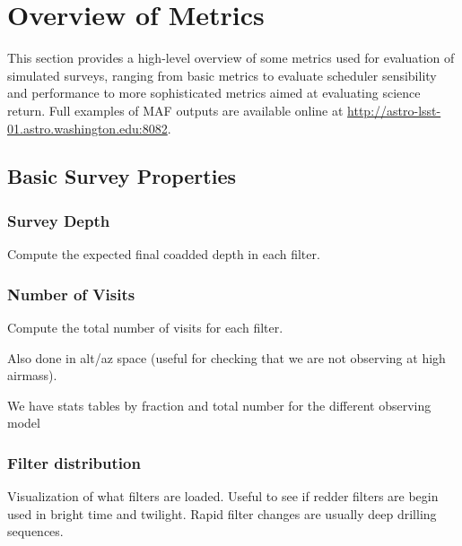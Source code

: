 \section{Overview of Metrics}
This section provides a high-level overview of some metrics used for evaluation of simulated surveys, ranging from basic metrics to evaluate scheduler sensibility and performance to more sophisticated metrics aimed at evaluating science return.
Full examples of MAF outputs are available online at \url{http://astro-lsst-01.astro.washington.edu:8082}.  

\subsection{Basic Survey Properties}

\subsubsection{Survey Depth}

Compute the expected final coadded depth in each filter. 

\subsubsection{Number of Visits}

Compute the total number of visits for each filter.


Also done in alt/az space (useful for checking that we are not observing at high airmass).


We have stats tables by fraction and total number for the different observing model

\subsubsection{Filter distribution}

Visualization of what filters are loaded. Useful to see if redder filters are begin used in bright time and twilight. Rapid filter changes are usually deep drilling sequences.


